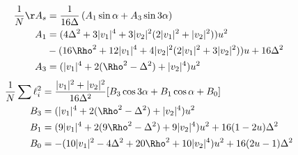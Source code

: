 \begin{align*}
    \frac{1}{N}\AA_s &= \frac{1}{16\Delta} \left(A_1\sin\alpha +A_3\sin 3\alpha\right)\\
    A_1  &= (4\Delta^2 + 3|v_1|^4 + 3|v_2|^2 (2|v_1|^2 +|v_2|^2))u^2 \\
    &- (16\Rho^2 + 12|v_1|^4 + 4|v_2|^2(2|v_1|^2 + 3|v_2|^2))u + 16\Delta^2\\
    A_3 &= (|v_1|^4+2(\Rho^2-\Delta^2)+|v_2|^4)u^2
\end{align*}
\begin{align*}
   \frac{1}{N} \sum \ell_i^2&=\frac{|v_1|^2+|v_2|^2}{16\Delta^2}[B_3\cos 3\alpha+ B_1\cos\alpha+B_0]\\
    B_3 &=  (|v_1|^4+2(\Rho^2-\Delta^2)+|v_2|^4)u^2\\
    B_1 &=  (9|v_1|^4+2(9\Rho^2-\Delta^2)+9|v_2|^4)u^2+16(1-2 u)\Delta^2 \\
    B_0 &= -(10|v_1|^2-4\Delta^2+20\Rho^2+10|v_2|^4)u^2+16(2 u-1)\Delta^2
\end{align*}
